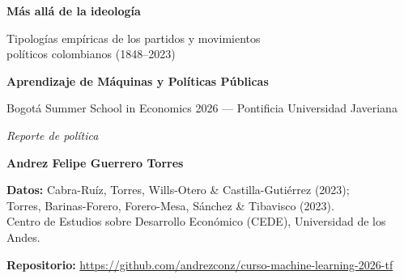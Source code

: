 \documentclass[11pt,letterpaper]{article}
\begin{document}
\begin{titlepage}
\centering
\vspace*{1.5cm}
{\Huge\bfseries\color{navy} Más allá de la ideología\par}
\vspace{0.5cm}
{\Large\color{teal} Tipologías empíricas de los partidos y movimientos\\ políticos colombianos (1848--2023)\par}
\vspace{1.8cm}
{\large\bfseries Aprendizaje de Máquinas y Políticas Públicas\par}
\vspace{0.2cm}
{\normalsize Bogotá Summer School in Economics 2026 --- Pontificia Universidad Javeriana\par}
\vspace{1.2cm}
{\large\itshape Reporte de política\par}
\vspace{1.2cm}
{\large\bfseries Andrez Felipe Guerrero Torres\par}
\vspace{2cm}
{\small
\textbf{Datos:} Cabra-Ruíz, Torres, Wills-Otero \& Castilla-Gutiérrez (2023);\\
Torres, Barinas-Forero, Forero-Mesa, Sánchez \& Tibavisco (2023).\\
Centro de Estudios sobre Desarrollo Económico (CEDE), Universidad de los Andes.\par}
\vspace{0.4cm}
{\small \textbf{Repositorio:} \url{https://github.com/andrezconz/curso-machine-learning-2026-tf}\par}
\vfill
\end{titlepage}
\end{document}
